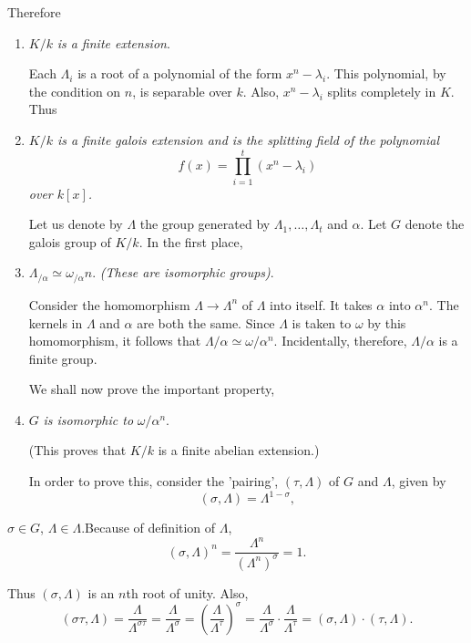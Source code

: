 Therefore
\begin{enumerate}[1)]
\item $K/k$ \textit{is a finite extension}.

Each $\Lambda_i$ is a root of a polynomial of the form $x^n -
\lambda_i$. This polynomial, by the condition on $n$, is separable over
$k$. Also, $x^n - \lambda_i$ splits completely in $K$. Thus  

\item \textit{$K/k$ is a finite galois extension and is the splitting
  field of the polynomial 
$$
f(x) = \prod^t_{i=1} (x^n - \lambda_i)
$$
over $k[x]$.}

Let us denote by $\Lambda$ the group generated by $\Lambda_1, \ldots,
\Lambda_t$ and $\alpha$. Let $G$ denote the galois group of $K/k$. In
the first place, 

\item $\Lambda_{/\alpha}  \simeq \omega_{/\alpha} n$. \textit{(These are
  isomorphic groups)}. 

Consider the homomorphism $\Lambda \to \Lambda^n$ of $\Lambda$ into
itself. It takes $\alpha$ into $\alpha^n$. The kernels in $\Lambda$
and $\alpha$ are both the same. Since $\Lambda$ is taken to $\omega$
by this homomorphism, it follows that $\Lambda / \alpha \simeq
\omega/\alpha^n$. Incidentally, therefore, $\Lambda/\alpha$ is a
finite group. 

We shall now prove the important property,

\item $G$ \textit{is isomorphic to} $\omega/\alpha^n$.

(This proves that $K/k$ is a finite abelian extension.)

In order to prove this, consider the 'pairing', $(\tau,\Lambda)$ of
$G$ and $\Lambda$, given by   
\begin{equation*}
(\sigma,\Lambda)=\Lambda^{1-\sigma}, \tag{7}\label{c6:eq7}
\end{equation*}
\end{enumerate}
$\sigma \in G$, $\Lambda \in \Lambda$.\pageoriginale Because of
definition of  $\Lambda$, 
$$
(\sigma,\Lambda)^n = \frac{\Lambda^n}{(\Lambda^n)^{\sigma}}=1.
$$

Thus $(\sigma,\Lambda)$ is an $n$th root of unity. Also,
$$
(\sigma \tau,\Lambda)  = \frac{\Lambda}{\Lambda^{\sigma \tau}} =
\frac{\Lambda}{\Lambda^{\sigma}}= 
\left(\frac{\Lambda}{\Lambda^{\tau}} \right)^{\sigma} =
\frac{\Lambda}{\Lambda^{\sigma}} \cdot  \frac{\Lambda}{\Lambda^{\tau}} =
(\sigma,\Lambda) \cdot (\tau,\Lambda).   
$$

